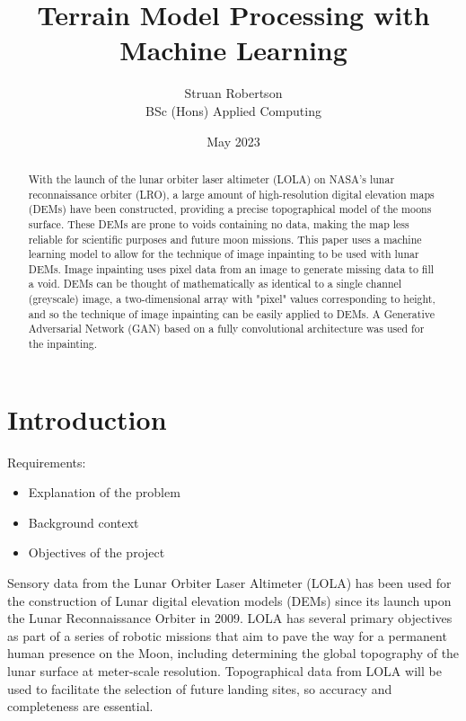 \documentclass[twocolumn]{article}
\author{Struan Robertson \\ BSc (Hons) Applied Computing}
\date{May 2023}
\title{Terrain Model Processing with Machine Learning}
\begin{document}
\maketitle
\begin{abstract}

With the launch of the lunar orbiter laser altimeter (LOLA) on NASA's lunar reconnaissance orbiter (LRO), a large amount of high-resolution digital elevation maps (DEMs) have been constructed, providing a precise topographical model of the moons surface.
These DEMs are prone to voids containing no data, making the map less reliable for scientific purposes and future moon missions.
This paper uses a machine learning model to allow for the technique of image inpainting to be used with lunar DEMs.
Image inpainting uses pixel data from an image to generate missing data to fill a void.
DEMs can be thought of mathematically as identical to a single channel (greyscale) image, a two-dimensional array with "pixel" values corresponding to height, and so the technique of image inpainting can be easily applied to DEMs.
A Generative Adversarial Network (GAN) based on a fully convolutional architecture was used for the inpainting.


\end{abstract}

\section{Introduction}
\label{sec:orgeec5de1}

Requirements:
\begin{itemize}
\item Explanation of the problem
\item Background context
\item Objectives of the project
\end{itemize}

Sensory data from the Lunar Orbiter Laser Altimeter (LOLA) has been used for the construction of Lunar digital elevation models (DEMs) since its launch upon the Lunar Reconnaissance Orbiter in 2009.
LOLA has several primary objectives as part of a series of robotic missions that aim to pave the way for a permanent human presence on the Moon, including determining the global topography of the lunar surface at meter-scale resolution.
Topographical data from LOLA will be used to facilitate the selection of future landing sites, so accuracy and completeness are essential.
\autocite{chinLunarReconnaissanceOrbiter2007}
\end{document}
